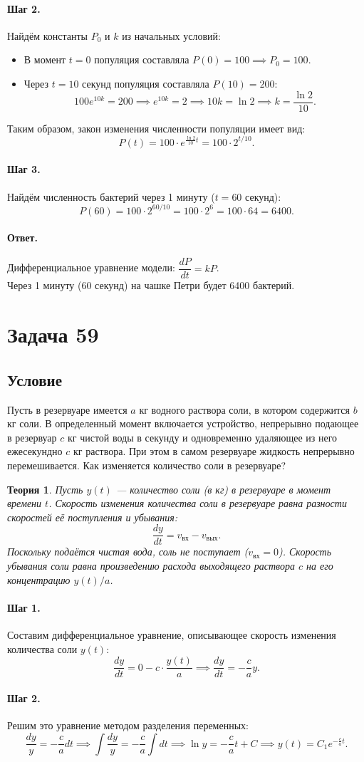 \documentclass[12pt,a4paper]{article}
\theoremstyle{solution}
\newtheorem*{theory}{Теория}
\newcommand{\task}[1]{\newpage\section*{Задача #1}}
\newcommand{\answer}{\paragraph{Ответ.}}
\newcommand{\step}[1]{\paragraph{Шаг #1.}}
\begin{document}
\step{2} Найдём константы $P_0$ и $k$ из начальных условий:
\begin{itemize}
    \item В момент $t = 0$ популяция составляла $P(0) = 100 \implies P_0 = 100$.
    \item Через $t = 10$ секунд популяция составляла $P(10) = 200$:
    \[
    100 e^{10k} = 200 \implies e^{10k} = 2 \implies 10k = \ln 2 \implies k = \frac{\ln 2}{10}.
    \]
\end{itemize}
Таким образом, закон изменения численности популяции имеет вид:
\[
P(t) = 100 \cdot e^{\frac{\ln 2}{10} t} = 100 \cdot 2^{t/10}.
\]

\step{3} Найдём численность бактерий через 1 минуту ($t = 60$ секунд):
\[
P(60) = 100 \cdot 2^{60/10} = 100 \cdot 2^6 = 100 \cdot 64 = 6400.
\]

\answer
Дифференциальное уравнение модели: $\dfrac{dP}{dt} = k P$.\\
Через 1 минуту (60 секунд) на чашке Петри будет 6400 бактерий.

\task{59}
\subsection*{Условие}
Пусть в резервуаре имеется $a$ кг водного раствора соли, в котором содержится $b$ кг соли. В определенный момент включается устройство, непрерывно подающее в резервуар $c$ кг чистой воды в секунду и одновременно удаляющее из него ежесекундно $c$ кг раствора. При этом в самом резервуаре жидкость непрерывно перемешивается. Как изменяется количество соли в резервуаре?

\begin{theory}
Пусть $y(t)$ — количество соли (в кг) в резервуаре в момент времени $t$. 
Скорость изменения количества соли в резервуаре равна разности скоростей её поступления и убывания:
\[
\frac{dy}{dt} = v_{\text{вх}} - v_{\text{вых}}.
\]
Поскольку подаётся чистая вода, соль не поступает ($v_{\text{вх}} = 0$). Скорость убывания соли равна произведению расхода выходящего раствора $c$ на его концентрацию $y(t)/a$.
\end{theory}

\step{1} Составим дифференциальное уравнение, описывающее скорость изменения количества соли $y(t)$:
\[
\frac{dy}{dt} = 0 - c \cdot \frac{y(t)}{a} \implies \frac{dy}{dt} = -\frac{c}{a} y.
\]

\step{2} Решим это уравнение методом разделения переменных:
\[
\frac{dy}{y} = -\frac{c}{a} dt \implies \int \frac{dy}{y} = -\frac{c}{a} \int dt \implies \ln y = -\frac{c}{a} t + C \implies y(t) = C_1 e^{-\frac{c}{a} t}.
\]
\end{document}
